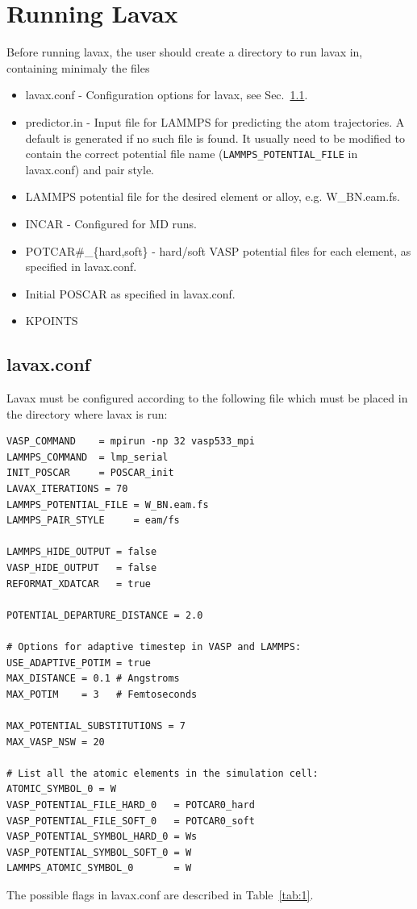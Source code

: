 \documentclass{article}
\begin{document}
\section{Running Lavax}
Before running lavax, the user should create a directory to run lavax in, containing minimaly the files
\begin{itemize}
\item lavax.conf - Configuration options for lavax, see Sec.~\ref{sec:lavax_conf}.
\item predictor.in - Input file for LAMMPS for predicting the atom trajectories. A default is generated if no such file is found. It usually need to be modified to contain the correct potential file name (\texttt{LAMMPS\_POTENTIAL\_FILE} in lavax.conf) and pair style.
\item LAMMPS potential file for the desired element or alloy, e.g. W\_BN.eam.fs.
\item INCAR - Configured for MD runs.
\item POTCAR\#\_\{hard,soft\} - hard/soft VASP potential files for each element, as specified in lavax.conf.
\item Initial POSCAR as specified in lavax.conf.
\item KPOINTS
\end{itemize}

\newpage
\subsection{lavax.conf}
\label{sec:lavax_conf}
Lavax must be configured according to the following file which must be placed in the directory where lavax is run:
\begin{verbatim}
VASP_COMMAND    = mpirun -np 32 vasp533_mpi
LAMMPS_COMMAND  = lmp_serial
INIT_POSCAR     = POSCAR_init
LAVAX_ITERATIONS = 70
LAMMPS_POTENTIAL_FILE = W_BN.eam.fs
LAMMPS_PAIR_STYLE     = eam/fs

LAMMPS_HIDE_OUTPUT = false
VASP_HIDE_OUTPUT   = false
REFORMAT_XDATCAR   = true

POTENTIAL_DEPARTURE_DISTANCE = 2.0

# Options for adaptive timestep in VASP and LAMMPS:
USE_ADAPTIVE_POTIM = true
MAX_DISTANCE = 0.1 # Angstroms
MAX_POTIM    = 3   # Femtoseconds

MAX_POTENTIAL_SUBSTITUTIONS = 7
MAX_VASP_NSW = 20

# List all the atomic elements in the simulation cell:
ATOMIC_SYMBOL_0 = W
VASP_POTENTIAL_FILE_HARD_0   = POTCAR0_hard
VASP_POTENTIAL_FILE_SOFT_0   = POTCAR0_soft
VASP_POTENTIAL_SYMBOL_HARD_0 = Ws
VASP_POTENTIAL_SYMBOL_SOFT_0 = W
LAMMPS_ATOMIC_SYMBOL_0       = W
\end{verbatim}
The possible flags in lavax.conf are described in Table~\ref{tab:1}.
\end{document}
